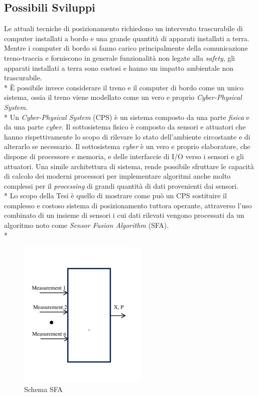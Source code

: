 \subsection{Possibili Sviluppi}
Le attuali tecniche di posizionamento richiedono un intervento trascurabile di computer installati a bordo e una grande quantit\`a di apparati installati a terra. Mentre i computer di bordo si fanno carico principalmente della comunicazione treno-traccia e forniscono in generale funzionalit\`a non legate alla \emph{safety}, gli apparati installati a terra sono costosi e hanno un impatto ambientale non trascurabile.\\*
\`E possibile invece considerare il treno e il computer di bordo come un unico sistema, ossia il treno viene modellato come un vero e proprio \emph{Cyber-Physical System}.\\*
Un \emph{Cyber-Physical System} (CPS) \`e un sistema composto da una parte \emph{fisica} e da una parte \emph{cyber}. Il sottosistema fisico \`e composto da sensori e attuatori che hanno rispettivamente lo scopo di rilevare lo stato dell'ambiente circostante e di alterarlo se necessario. Il sottosistema \emph{cyber} \`e un vero e proprio elaboratore, che dispone di processore e memoria, e delle interfaccie di I/O verso i sensori e gli attuatori. Una simile architettura di sistema, rende possibile sfruttare le capacit\`a di calcolo dei moderni processori per implementare algoritmi anche molto complessi per il \emph{processing} di grandi quantit\`a di dati provenienti dai sensori.\\*
Lo scopo della Tesi \`e quello di mostrare come pu\`o un CPS sostituire il complesso e costoso sistema di posizionamento tuttora operante, attraverso l'uso combinato di un insieme di sensori i cui dati rilevati vengono processati da un algoritmo noto come \emph{Sensor Fusion Algorithm} (SFA).\\*
\begin{figure}[h]
	\centering
	\includegraphics{img/sfaschema}
	\caption{Schema SFA}
	\label{fig:sfa}
\end{figure}
